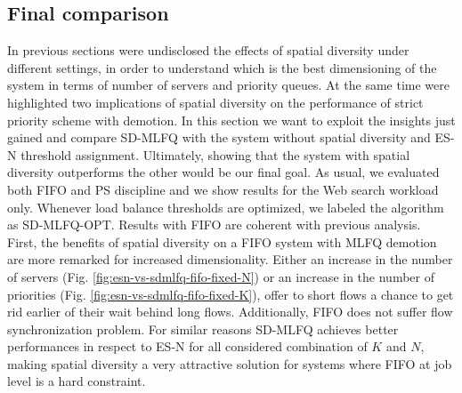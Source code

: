 \subsection{Final comparison}
\label{sec:final-comparison}
In previous sections were undisclosed the effects of spatial diversity under different settings, in order to understand which is the best dimensioning of the system in terms of number of servers and priority queues. At the same time were highlighted two implications of spatial diversity on the performance of strict priority scheme with demotion. In this section we want to exploit the insights just gained and compare SD-MLFQ with the system without spatial diversity and ES-N threshold assignment. Ultimately, showing that the system with spatial diversity outperforms the other would be our final goal. As usual, we evaluated both FIFO and PS discipline and we show results for the Web search workload only. Whenever load balance thresholds are optimized, we labeled the algorithm as SD-MLFQ-OPT. Results with FIFO are coherent with previous analysis. \\
First, the benefits of spatial diversity on a FIFO system with MLFQ demotion are more remarked for increased dimensionality. Either an increase in the number of servers (Fig. \ref{fig:esn-vs-sdmlfq-fifo-fixed-N}) or an increase in the number of priorities (Fig. \ref{fig:esn-vs-sdmlfq-fifo-fixed-K}), offer to short flows a chance to get rid earlier of their wait behind long flows. Additionally, FIFO does not suffer flow synchronization problem. For similar reasons SD-MLFQ achieves better performances in respect to ES-N for all considered combination of $K$ and $N$, making spatial diversity a very attractive solution for systems where FIFO at job level is a hard constraint.
